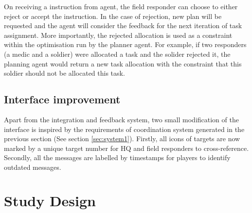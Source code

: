On receiving a instruction from agent, the field responder can choose to either reject or accept the instruction. In the case of rejection, new plan will be requested and the agent will consider the feedback for the next iteration of task assignment. More importantly, the rejected allocation is used as a constraint within the optimisation run by the planner agent. For example, if two responders (a medic and a soldier) were allocated a task and the solider rejected it, the planning agent would return a new task allocation with the constraint that this soldier should not be allocated this task. \\

\subsection{Interface improvement}
Apart from the integration and feedback system, two small modification of the interface is inspired by the requirements of coordination system generated in the previous section (See section \ref{sec:system1}). Firstly, all icons of targets are now marked by a unique target number for HQ and field responders to cross-reference. Secondly, all the messages are labelled by timestamps for players to identify outdated messages.\\

\section{Study Design}


